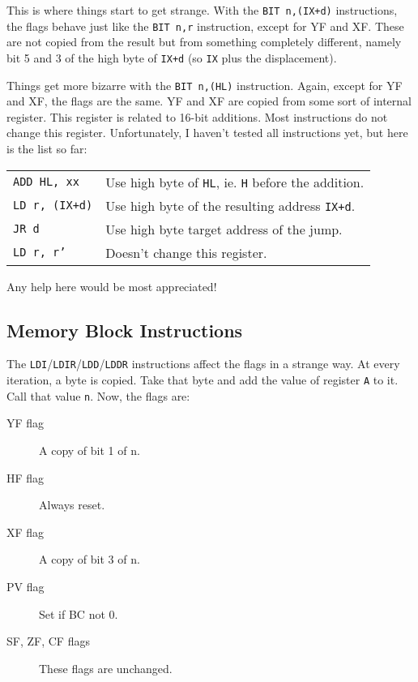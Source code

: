 This is where things start to get strange. With the {\tt BIT n,(IX+d)} instructions, the flags behave just like the {\tt BIT n,r} instruction, except for YF and XF. These are not copied from the result but from something completely different, namely bit 5 and 3 of the high byte of {\tt IX+d} (so {\tt IX} plus the displacement).

Things get more bizarre with the {\tt BIT n,(HL)} instruction. Again, except for YF and XF, the flags are the same. YF and XF are copied from some sort of internal register. This register is related to 16-bit additions. Most instructions do not change this register. Unfortunately, I haven't tested all instructions yet, but here is the list so far:

\begin{tabularx}{\linewidth}{@{}lX}
	{\tt ADD HL, xx}
		& Use high byte of {\tt HL}, ie. {\tt H} before the addition. \\

	{\tt LD r, (IX+d)}
		& Use high byte of the resulting address {\tt IX+d}. \\

	{\tt JR d}
		& Use high byte target address of the jump. \\

	{\tt LD r, r'}
		& Doesn't change this register. \\
\end{tabularx}

Any help here would be most appreciated!


\pagebreak
\subsection{Memory Block Instructions \cite{mrison}}
\label{block_mem}

The {\tt LDI}/{\tt LDIR}/{\tt LDD}/{\tt LDDR} instructions affect the flags in a strange way. At every iteration, a byte is copied. Take that byte and add the value of register {\tt A} to it. Call that value {\tt n}. Now, the flags are:

\begin{description}
 
	\item[YF flag]
	A copy of bit 1 of n.

	\item[HF flag]
	Always reset.

	\item[XF flag]
	A copy of bit 3 of n.

	\item[PV flag]
	Set if BC not 0.

	\item[SF, ZF, CF flags]
	These flags are unchanged.

\end{description}


